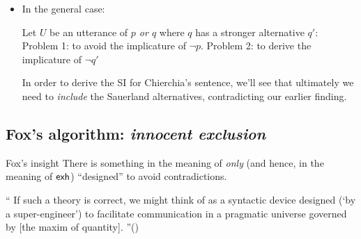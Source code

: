 \documentclass[landscape,cronos,paper=letter]{ling-handout}
\begin{document}
\begin{itemize}
\item In the general case:

\pex
Let $U$ be an utterance of \textit{$p$ or $q$} where $q$ has a stronger alternative $q'$:
\a Problem 1: to avoid the implicature of $¬ p$.
\a Problem 2: to derive the implicature of $¬ q'$
\xe

\begin{tcolorbox}
In order to derive the SI for Chierchia's sentence, we'll see that ultimately we need to \textit{include} the Sauerland alternatives, contradicting our earlier finding.
\end{tcolorbox}

\end{itemize}

\subsection{Fox's algorithm: \textit{innocent exclusion}}

\begin{tcolorbox}
Fox's insight
\tcblower
There is something in the meaning of \textit{only} (and hence, in the meaning of $\textsf{exh}$) \enquote{designed} to avoid contradictions.

\vspace{1\baselineskip}

\enquote{
If such a theory is correct, we might think of  as a syntactic device designed (‘by a super-engineer’) to facilitate communication in a pragmatic universe governed by [the maxim of quantity].
}\hfill (\citealt[p.\,80]{fox2007})
\end{tcolorbox}
\end{document}

